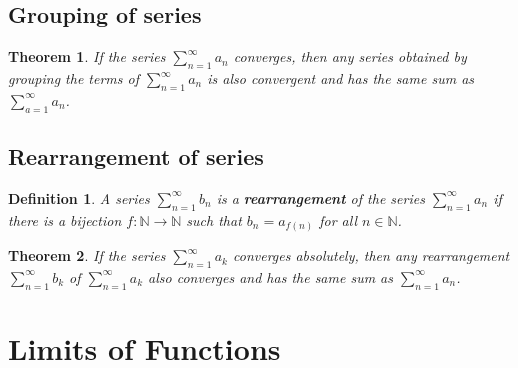 \documentclass[12pt]{article}
\newtheorem{definition}{Definition}[section]
\newtheorem{theorem}{Theorem}[section]
\theoremstyle{definition}
\begin{document}
\subsection{Grouping of series}
\begin{theorem}\normalfont If the series $\sum_{n=1}^\infty a_n$ converges, then any series obtained by grouping the terms of $\sum_{n=1}^\infty a_n$ is also convergent and has the same sum as $\sum_{a=1}^\infty a_n$.
\end{theorem}
\subsection{Rearrangement of series}
\begin{definition}\normalfont A series $\sum_{n=1}^\infty b_n$ is a \textbf{rearrangement} of the series $\sum_{n=1}^\infty a_n$ if there is a bijection $f:\mathbb{N}\to\mathbb{N}$ such that $b_n=a_{f(n)}$ for all $n\in \mathbb{N}$.
\end{definition}
\begin{theorem}\normalfont If the series $\sum_{n=1}^\infty a_k$ converges absolutely, then any rearrangement $\sum_{n=1}^\infty b_k$ of $\sum_{n=1}^\infty a_k$ also converges and has the same sum as $\sum_{n=1}^\infty a_n$.
\end{theorem}
\clearpage
\section{Limits of Functions}
\end{document}
